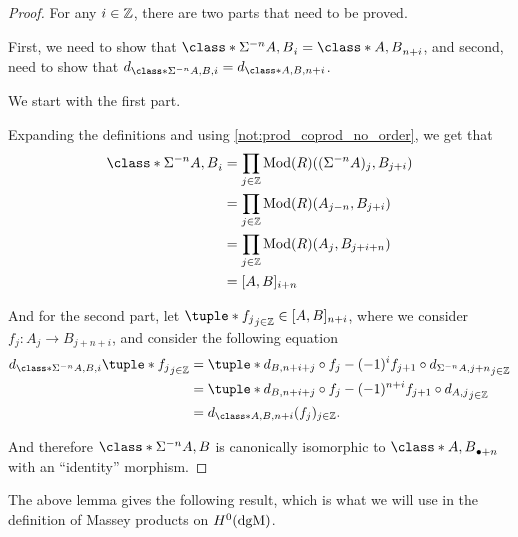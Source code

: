 \begin{proof}
    For any \( i \in {\mathbb{Z}} \), there are two parts that need to be proved.

    First, we need to show that \( \class*{\Sigma^{-n} A, B}_i = \class*{A, B}_{n + i} \), and second, need to show that \( d_{\class*{\Sigma^{-n} A, B}, i} = d_{\class*{A, B}, n + i} \).

    We start with the first part.

    Expanding the definitions and using \autoref{not:prod_coprod_no_order}, we get that
    \begin{align*}
        \class*{\Sigma^{-n} A, B}_i &= \prod_{j \in \Zb} \Mod(R)((\Sigma^{-n} A)_j, B_{j + i}) \\
        &= \prod_{j \in \Zb} \Mod(R)(A_{j - n}, B_{j + i}) \\
        &= \prod_{j \in \Zb} \Mod(R)(A_j, B_{j + i + n}) \\
        &= [A, B]_{i + n}
    \end{align*}

    And for the second part, let \( \tuple*{f_j}_{j \in \Zb} \in [A, B]_{n + i} \), where we consider \( f_j: A_j \to B_{j + n + i} \), and consider the following equation
    \begin{align*}
        d_{\class*{\Sigma^{-n} A, B}, i}\tuple*{f_j}_{j \in \Zb} &= \tuple*{d_{B, n + i + j} \circ f_j - (-1)^i f_{j + 1} \circ d_{\Sigma^{-n} A, j + n}}_{j \in \Zb} \\
        &= \tuple*{d_{B, n + i + j} \circ f_j - (-1)^{n + i} f_{j + 1} \circ d_{A, j}}_{j \in \Zb} \\
        &= d_{\class*{A, B}, n + i}(f_j)_{j \in \Zb}.
    \end{align*}

    And therefore \( \class*{\Sigma^{-n} A, B} \) is canonically isomorphic to \( \class*{A, B}_{\bullet+n} \) with an ``identity'' morphism.
\end{proof}

The above lemma gives the following result, which is what we will use in the definition of Massey products on \( H^0(\operatorname{dgM}) \). 

